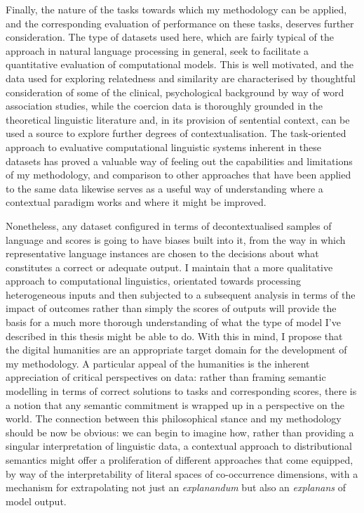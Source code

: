 Finally, the nature of the tasks towards which my methodology can be applied, and the corresponding evaluation of performance on these tasks, deserves further consideration.  The type of datasets used here, which are fairly typical of the approach in natural language processing in general, seek to facilitate a quantitative evaluation of computational models.  This is well motivated, and the data used for exploring relatedness \citep{FinkelsteinEA2002} and similarity \citep{HillEA2015} are characterised by thoughtful consideration of some of the clinical, psychological background by way of word association studies, while the coercion data \citep{PustejovskyEA2010} is thoroughly grounded in the theoretical linguistic literature and, in its provision of sentential context, can be used a source to explore further degrees of contextualisation.  The task-oriented approach to evaluative computational linguistic systems inherent in these datasets has proved a valuable way of feeling out the capabilities and limitations of my methodology, and comparison to other approaches that have been applied to the same data likewise serves as a useful way of understanding where a contextual paradigm works and where it might be improved.

Nonetheless, any dataset configured in terms of decontextualised samples of language and scores is going to have biases built into it, from the way in which representative language instances are chosen to the decisions about what constitutes a correct or adequate output.  I maintain that a more qualitative approach to computational linguistics, orientated towards processing heterogeneous inputs and then subjected to a subsequent analysis in terms of the impact of outcomes rather than simply the scores of outputs will provide the basis for a much more thorough understanding of what the type of model I've described in this thesis might be able to do.  With this in mind, I propose that the digital humanities are an appropriate target domain for the development of my methodology.  A particular appeal of the humanities is the inherent appreciation of critical perspectives on data: rather than framing semantic modelling in terms of correct solutions to tasks and corresponding scores, there is a notion that any semantic commitment is wrapped up in a perspective on the world.  The connection between this philosophical stance and my methodology should be now be obvious: we can begin to imagine how, rather than providing a singular interpretation of linguistic data, a contextual approach to distributional semantics might offer a proliferation of different approaches that come equipped, by way of the interpretability of literal spaces of co-occurrence dimensions, with a mechanism for extrapolating not just an \emph{explanandum} but also an \emph{explanans} of model output.

